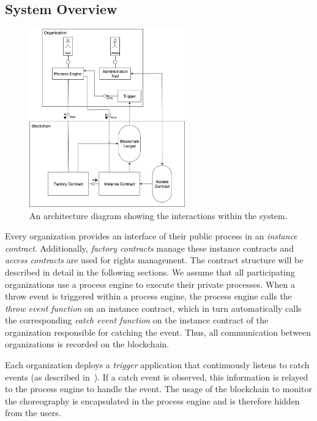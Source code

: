 \documentclass[runningheads]{llncs}
\begin{document}
\subsection{System Overview}
\begin{figure}
	\centering
	\includegraphics[width=0.6\textwidth]{fig/system_diagram.eps}
	\caption{An architecture diagram showing the interactions within the system.}
	\label{fig:system_diagram}
\end{figure}

Every organization provides an interface of their public process in an \emph{instance contract}.
Additionally, \emph{factory contracts} manage these instance contracts and \emph{access contracts} are used for rights management.
The contract structure will be described in detail in the following sections.
We assume that all participating organizations use a process engine to execute their private processes.
When a throw event is triggered within a process engine, the process engine calls the \emph{throw event function} on an instance contract, which in turn automatically calls the corresponding \emph{catch event function} on the instance contract of the organization responsible for catching the event.
Thus, all communication between organizations is recorded on the blockchain.

Each organization deploys a \emph{trigger} application that continuously listens to catch events (as described in~\cite{weber2016untrusted}).
If a catch event is observed, this information is relayed to the process engine to handle the event.
The usage of the blockchain to monitor the choreography is encapsulated in the process engine and is therefore hidden from the users.
\end{document}
